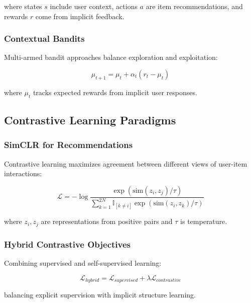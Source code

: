 \documentclass[acmsmall,review,anonymous]{acmart}
\begin{document}
where states $s$ include user context, actions $a$ are item recommendations, and rewards $r$ come from implicit feedback.

\subsubsection{Contextual Bandits}

Multi-armed bandit approaches balance exploration and exploitation:

\begin{equation}
\mu_{t+1} = \mu_t + \alpha_t (r_t - \mu_t)
\label{eq:bandit_update}
\end{equation}

where $\mu_t$ tracks expected rewards from implicit user responses.

\subsection{Contrastive Learning Paradigms}

\subsubsection{SimCLR for Recommendations}

Contrastive learning maximizes agreement between different views of user-item interactions:

\begin{equation}
\mathcal{L} = -\log \frac{\exp(\text{sim}(z_i, z_j)/\tau)}{\sum_{k=1}^{2N} \mathbb{I}_{[k \neq i]} \exp(\text{sim}(z_i, z_k)/\tau)}
\label{eq:contrastive}
\end{equation}

where $z_i, z_j$ are representations from positive pairs and $\tau$ is temperature.

\subsubsection{Hybrid Contrastive Objectives}

Combining supervised and self-supervised learning:

\begin{equation}
\mathcal{L}_{hybrid} = \mathcal{L}_{supervised} + \lambda \mathcal{L}_{contrastive}
\label{eq:hybrid_contrastive}
\end{equation}

balancing explicit supervision with implicit structure learning.
\end{document}
